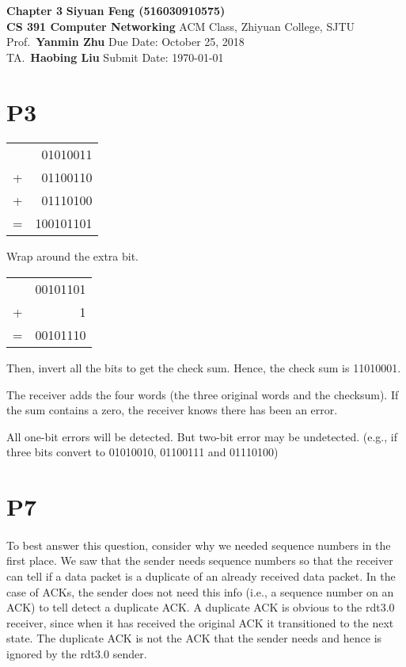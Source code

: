 \documentclass[a4paper, 11pt]{article}
\begin{document}
\noindent
\large\textbf{Chapter 3} \hfill \textbf{Siyuan Feng (516030910575)} \\
\normalsize {\bf CS 391 Computer Networking} \hfill ACM Class, Zhiyuan College, SJTU\\
Prof.~{\bf Yanmin Zhu} \hfill Due Date: October 25, 2018\\
TA.~{\bf Haobing Liu} \hfill Submit Date: \today

\section*{P3}
\paragraph{}
	\begin{tabular}{lr}
	 &01010011\\
	+&01100110\\
	+&01110100\\
	\hline
	=&100101101
	\end{tabular}
	
Wrap around the extra bit.
	
	\begin{tabular}{lr}
	 &00101101\\
	+&1\\
	\hline
	=&00101110
	\end{tabular}

Then, invert all the bits to get the check sum. Hence, the check sum is 11010001.

The receiver adds the four words (the three original words and the
checksum). If the sum contains a zero, the receiver knows there has been an error. 

All one-bit errors will be detected. But two-bit error may be undetected. (e.g., if three bits convert to 01010010, 01100111 and 01110100)

\section*{P7}
\paragraph{}
To best answer this question, consider why we needed sequence numbers in the first place. We saw that the sender needs sequence numbers so that the receiver can tell if a data packet is a duplicate of an already received data packet. In the case of ACKs, the sender does not need this info (i.e., a sequence number on an ACK) to tell detect a duplicate ACK. A duplicate ACK is obvious to the rdt3.0 receiver, since when it has received the original ACK it transitioned to the next state. The duplicate ACK is not the ACK that the sender needs and hence is ignored by the rdt3.0 sender.
\end{document}
